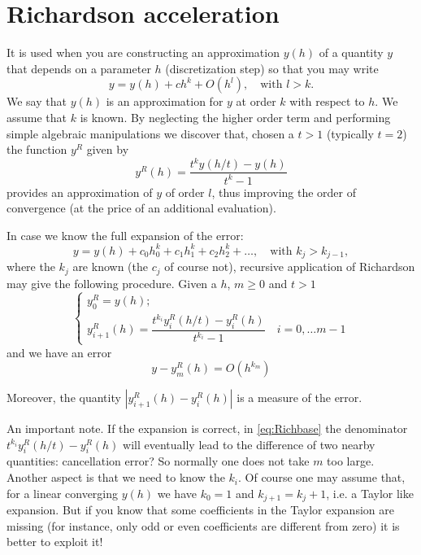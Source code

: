 \documentclass[10pt,a4paper,twoside]{article}
\begin{document}
    \section*{Richardson acceleration}
    
    It is used when you are constructing an approximation $y(h)$ of a quantity $y$ that depends on a parameter $h$ (discretization step) so that you may write
    \begin{equation}
    y = y(h) + ch^k +O(h^l),\quad \text{with } l>k.
    \end{equation} 
    We say that $y(h)$ is an approximation for $y$ at order $k$ with respect to $h$. We assume that $k$ is known. By neglecting the higher order term and performing simple algebraic manipulations
    we discover that, chosen a $t>1$ (typically $t=2$) the function $y^R$ given by
    \begin{equation}
    y^R(h)=\frac{t^ky(h/t)-y(h)}{t^k-1}
    \end{equation} 
    provides an approximation of $y$ of order $l$, thus improving the order of convergence (at the price of an additional evaluation).
    
    In case we know the full expansion of the error:
      \begin{equation}\label{eq:expansion}
   y = y(h) + c_0h^k_0 + c_1h^k_1 +c_2h^k_2 + \ldots,\quad \text{with } k_j>k_{j-1},
   \end{equation} 
    where the $k_j$ are known (the $c_j$ of course not), recursive application of Richardson may give the following procedure. Given a $h$, $m\ge 0$ and $t>1$
    \begin{equation}\label{eq:Richbase}
    \begin{cases}
    y^R_0=y(h);\\
    y^R_{i+1}(h)=\dfrac{t^{k_i}y^R_i(h/t)-y^R_i(h)}{t^{k_i}-1}\quad i=0,\ldots m-1
    \end{cases}
    \end{equation}
    and we have an error
    \begin{equation}
    y-y^R_m(h)=O(h^{k_m})
    \end{equation}
  
  Moreover, the quantity $|y^R_{i+1}(h)- y^R_i(h)|$ is a measure of the error.
    
    An important note. If the expansion is correct, in \eqref{eq:Richbase} the denominator $t^{k_i}y^R_i(h/t)-y^R_i(h)$ will eventually lead to the difference of two nearby quantities: cancellation error? So normally one does not take $m$ too large. Another aspect is that we need to know the $k_i$. Of course one may assume that, for a linear converging $y(h)$ we have $k_0=1$ and 
    $k_{j+1}=k_j+1$, i.e. a Taylor like expansion. But if you know that some coefficients in the Taylor expansion are missing (for instance, only odd or even coefficients are different from zero) it is better to exploit it!
  
\end{document}
